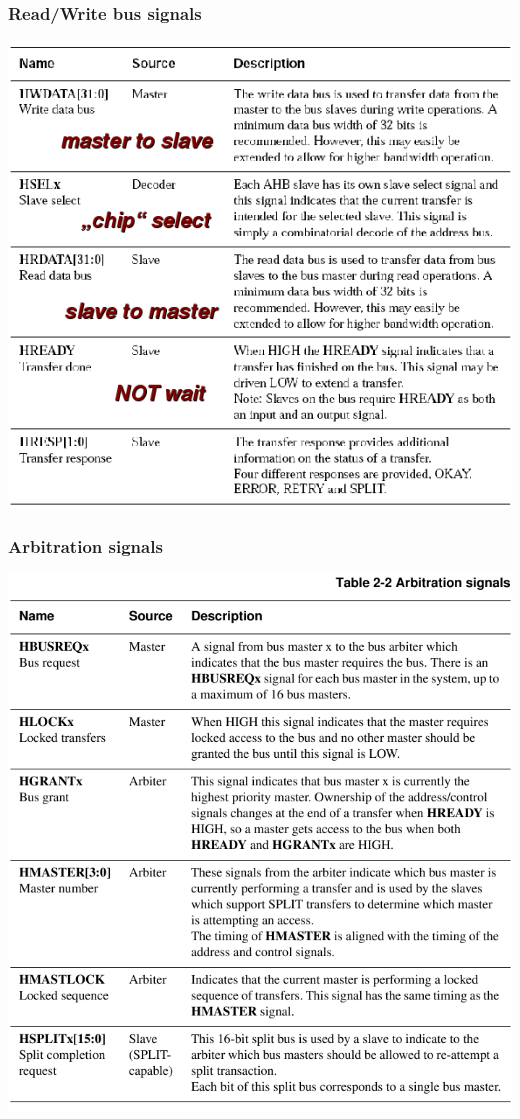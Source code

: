 \documentclass[a4paper]{scrartcl}
\begin{document}
        \subsubsection*{Read/Write bus signals}
        \centering\includegraphics[scale=0.6]{amba2.png}
        \subsubsection*{Arbitration signals}
        \centering\includegraphics[scale=0.6]{amba3.png}
\end{document}
